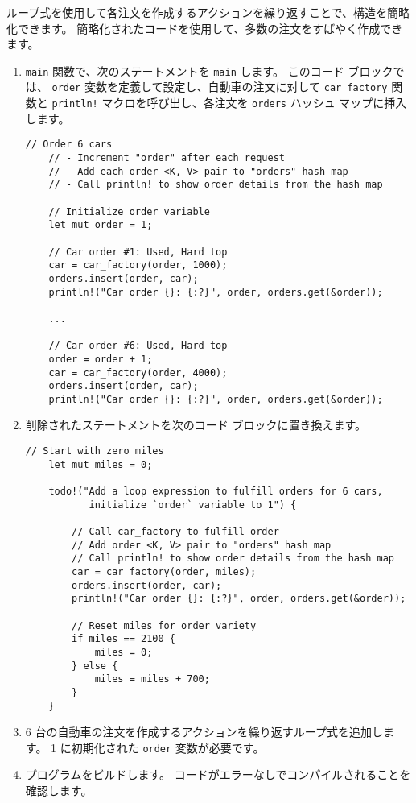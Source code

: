 ループ式を使用して各注文を作成するアクションを繰り返すことで、構造を簡略化できます。 簡略化されたコードを使用して、多数の注文をすばやく作成できます。

\begin{enumerate}

\item \texttt{main} 関数で、次のステートメントを \texttt{main} します。 このコード ブロックでは、 \texttt{order} 変数を定義して設定し、自動車の注文に対して \texttt{car\_factory} 関数と \texttt{println!} マクロを呼び出し、各注文を \texttt{orders} ハッシュ マップに挿入します。


\begin{lstlisting}[numbers=none]
    // Order 6 cars
    // - Increment "order" after each request
    // - Add each order <K, V> pair to "orders" hash map
    // - Call println! to show order details from the hash map

    // Initialize order variable
    let mut order = 1;

    // Car order #1: Used, Hard top
    car = car_factory(order, 1000);
    orders.insert(order, car);
    println!("Car order {}: {:?}", order, orders.get(&order));

    ...

    // Car order #6: Used, Hard top
    order = order + 1;
    car = car_factory(order, 4000);
    orders.insert(order, car);
    println!("Car order {}: {:?}", order, orders.get(&order));
\end{lstlisting}

\item 削除されたステートメントを次のコード ブロックに置き換えます。

\begin{lstlisting}[numbers=none]
    // Start with zero miles
    let mut miles = 0;

    todo!("Add a loop expression to fulfill orders for 6 cars,
           initialize `order` variable to 1") {

        // Call car_factory to fulfill order
        // Add order <K, V> pair to "orders" hash map
        // Call println! to show order details from the hash map        
        car = car_factory(order, miles);
        orders.insert(order, car);
        println!("Car order {}: {:?}", order, orders.get(&order));

        // Reset miles for order variety
        if miles == 2100 {
            miles = 0;
        } else {
            miles = miles + 700;
        }
    }
\end{lstlisting}

\item 6 台の自動車の注文を作成するアクションを繰り返すループ式を追加します。 1 に初期化された \texttt{order} 変数が必要です。

\item プログラムをビルドします。 コードがエラーなしでコンパイルされることを確認します。
\end{enumerate}

